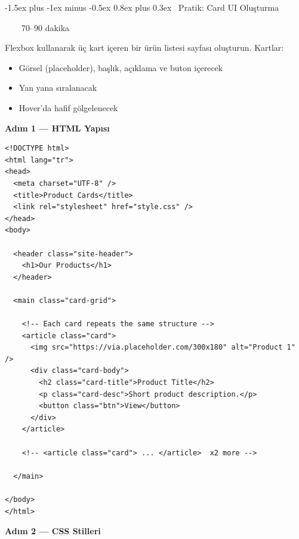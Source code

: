 \documentclass[12pt, a4paper]{article}
\makeatletter
\renewcommand{\section}{%
  \@startsection{section}{1}{\z@}%
    {-1.5ex plus -1ex minus -0.5ex}%
    {0.8ex plus 0.3ex}%
    {\normalfont\Large\bfseries\sffamily\color{primary}}%
}
\newcommand{\timebadge}[1]{%
  \noindent
  \colorbox{primary}{\color{white}\sffamily\bfseries\small\strut~~\faStopwatch~~#1~~}%
  \par\vspace{4pt}%
}
\makeatother
\begin{document}
\newpage
\section{\faHammer\ Pratik: Card UI Oluşturma}
\timebadge{70--90 dakika}

\begin{practicebox}
Flexbox kullanarak üç kart içeren bir ürün listesi sayfası oluşturun.
Kartlar:
\begin{itemize}
  \item Görsel (placeholder), başlık, açıklama ve buton içerecek
  \item Yan yana sıralanacak
  \item Hover'da hafif gölgelenecek
\end{itemize}
\end{practicebox}

\vspace{8pt}
\textbf{Adım 1 --- HTML Yapısı}

\begin{tcolorbox}[enhanced, colback=codebg, colframe=gray!30,
    colbacktitle=primary!85!black, coltitle=white, arc=4pt,
    title={\sffamily\bfseries\small index.html}]
\begin{lstlisting}[style=htmlstyle]
<!DOCTYPE html>
<html lang="tr">
<head>
  <meta charset="UTF-8" />
  <title>Product Cards</title>
  <link rel="stylesheet" href="style.css" />
</head>
<body>

  <header class="site-header">
    <h1>Our Products</h1>
  </header>

  <main class="card-grid">

    <!-- Each card repeats the same structure -->
    <article class="card">
      <img src="https://via.placeholder.com/300x180" alt="Product 1" />
      <div class="card-body">
        <h2 class="card-title">Product Title</h2>
        <p class="card-desc">Short product description.</p>
        <button class="btn">View</button>
      </div>
    </article>

    <!-- <article class="card"> ... </article>  x2 more -->

  </main>

</body>
</html>
\end{lstlisting}
\end{tcolorbox}

\vspace{8pt}
\textbf{Adım 2 --- CSS Stilleri}
\end{document}
